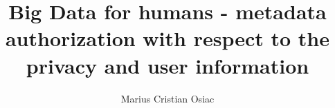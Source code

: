 \documentclass[12pt]{third-rep}
\title{Big Data for humans - metadata authorization with respect to the privacy and user information}
\author{Marius Cristian Osiac}
\begin{document}
\dotitleandabstract

\tableofcontents
\listoffigures
\listoftables
\listoflistings







\appendix

\end{document}
